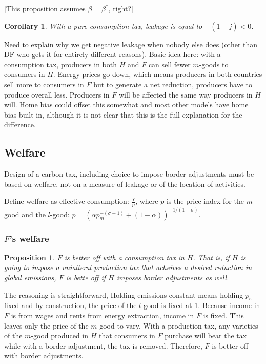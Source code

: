 \documentclass[notitlepage,12pt]{article}
\newtheorem{corollary}[theorem]{Corollary}
\newtheorem{proposition}[theorem]{Proposition}
\begin{document}
[This proposition assumes $\beta =\beta ^{\ast }$, right?]

\begin{corollary}
With a pure consumption tax, leakage is equal to $-\left( 1-\bar{j}\right)
<0 $.
\end{corollary}

Need to explain why we get negative leakage when nobody else does (other
than DF who gets it for entirely different reasons). Basic idea here: with a
consumption tax, producers in both $H$ and $F$ can sell fewer $m$-goods to
consumers in $H$. Energy prices go down, which means producers in both
countries sell more to consumers in $F$ but to generate a net reduction,
producers have to produce overall less. Producers in $F$ will be affected
the same way producers in $H$ will. Home bias could offset this somewhat and
most other models have home bias built in, although it is not clear that
this is the full explanation for the difference.

\subsection{Welfare\newline
}

Design of a carbon tax, including choice to impose border adjustments must
be based on welfare, not on a measure of leakage or of the location of
activities.

Define welfare as effective consumption: $\frac{Y}{p}$, where $p$ is the
price index for the $m$-good and the $l$-good: $p=\left( \alpha
p_{m}^{-\left( \sigma -1\right) }+\left( 1-\alpha \right) \right)
^{-1/\left( 1-\sigma \right) }$.

\subsubsection{$F$'s welfare}

\begin{proposition}
$F$ is better off with a consumption tax in $H$. That is, if $H$ is going to
impose a unialteral production tax that acheives a desired reduction in
global emissions, $F$ is bette off if $H$ imposes border adjustments as well.
\end{proposition}

The reasoning is straightforward, Holding emissions constant means holding $%
p_{e}$ fixed and by construction, the price of the $l$-good is fixed at 1.
Because income in $F$ is from wages and rents from energy extraction, income
in $F$ is fixed. This leaves only the price of the $m$-good to vary. With a
production tax, any varieties of the $m$-good produced in $H$ that consumers
in $F$ purchase will bear the tax while with a border adjustment, the tax is
removed. Therefore, $F$ is better off with border adjustments.
\end{document}
